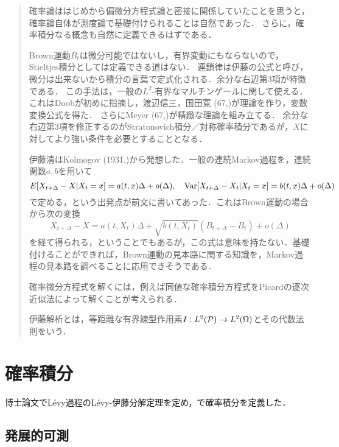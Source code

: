 \documentclass[uplatex,dvipdfmx]{jsreport}
\begin{document}
\begin{quotation}
    確率論ははじめから偏微分方程式論と密接に関係していたことを思うと，確率論自体が測度論で基礎付けられることは自然であった．
    さらに，確率積分なる概念も自然に定義できるはずである．

    Brown運動$B_t$は微分可能ではないし，有界変動にもならないので，Stieltjes積分としては定義できる道はない．
    連鎖律は伊藤の公式と呼び，微分は出来ないから積分の言葉で定式化される．余分な右辺第3項が特徴である．
    この手法は，一般の$L^2$-有界なマルチンゲールに関して使える．これはDoobが初めに指摘し，渡辺信三，国田寛 (67,\cite{KunitaWatanabe})が理論を作り，変数変換公式を得た．
    さらにMeyer (67,\cite{Meyer})が精緻な理論を組み立てる．
    余分な右辺第3項を修正するのがStratonovich積分／対称確率積分であるが，$X$に対してより強い条件を必要とすることとなる．

    伊藤清はKolmogov (1931,\cite{Kolmogorov31})から発想した．一般の連続Markov過程を，連続関数$a,b$を用いて
    \[E[X_{t+\Delta}-X|X_t=x]=a(t,x)\Delta+o(\Delta),\quad \mathrm{Var}[X_{t+\Delta}-X_t|X_t=x]=b(t,x)\Delta+o(\Delta)\]
    で定める，という出発点が前文に書いてあった．これはBrown運動の場合から次の変換
    \[X_{t+\Delta}-X=a(t,X_t)\Delta+\sqrt{b(t,X_t)}(B_{t+\Delta}-B_t)+o(\Delta)\]
    を経て得られる，ということでもあるが，この式は意味を持たない．基礎付けることができれば，Brown運動の見本路に関する知識を，Markov過程の見本路を調べることに応用できそうである．

    確率微分方程式を解くには，例えば同値な確率積分方程式をPicardの逐次近似法によって解くことが考えられる．

    伊藤解析とは，等距離な有界線型作用素$I:L^2(\mathcal{P})\to L^2(\Omega)$とその代数法則をいう．
\end{quotation}

\section{確率積分}

\begin{tcolorbox}[colframe=ForestGreen, colback=ForestGreen!10!white,breakable,colbacktitle=ForestGreen!40!white,coltitle=black,fonttitle=\bfseries\sffamily,
title=]
    博士論文\cite{Ito42}でLévy過程のLévy-伊藤分解定理を定め，\cite{Ito44}で確率積分を定義した．
\end{tcolorbox}

\subsection{発展的可測}
\end{document}
